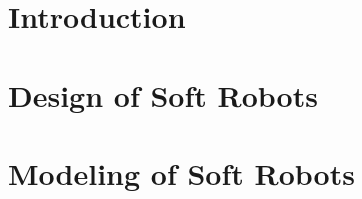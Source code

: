 \documentclass[print,thumbmain]{thesis}  %
\author{Brandon Jonathan Caasenbrood}
\begin{document}
\thispagestyle{empty}


%

%
%

\cleardoublepage
{}
\tableofcontents
\newpage


\isstarredchapterfalse
\cleardoublepage
\thispagestyle{empty}
\label{chap: intro}
\setcounter{page}{1}
\part{Introduction}\label{part: intro}

\cleardoublepage
\part{Design of Soft Robots}\label{part: design}


\part{Modeling of Soft Robots}\label{part: model}

\end{document}
